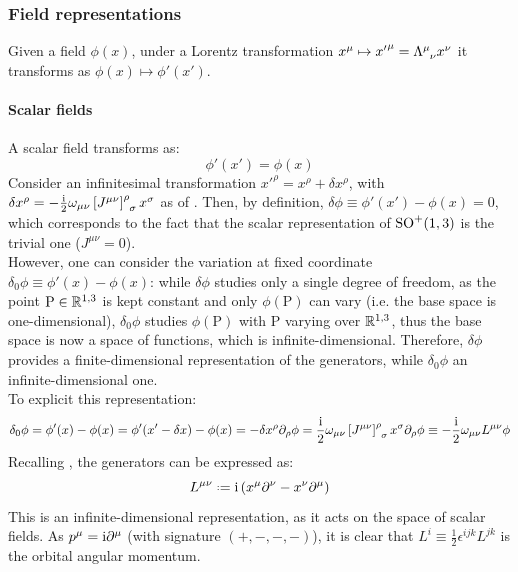 \subsubsection{Field representations}

Given a field $ \phi(x) $, under a Lorentz transformation $ x^\mu \mapsto {x'}^\mu = \tensor{\Lambda}{^\mu_\nu} x^\nu $ it transforms as $ \phi(x) \mapsto \phi'(x') $.

\paragraph{Scalar fields}

A scalar field transforms as:
\begin{equation}
  \phi'(x') = \phi(x)
\end{equation}
Consider an infinitesimal transformation $ x'^\rho = x^\rho + \delta x^\rho $, with $ \delta x^\rho = - \frac{\img}{2} \omega_{\mu \nu} \tensor{\left[ J^{\mu \nu} \right]}{^\rho_\sigma} x^\sigma $ as of . Then, by definition, $ \delta \phi \equiv \phi'(x') - \phi(x) = 0 $, which corresponds to the fact that the scalar representation of $ \mathrm{SO}^+(1,3) $ is the trivial one ($ J^{\mu \nu} = 0 $).\\
However, one can consider the variation at fixed coordinate $ \delta_0 \phi \equiv \phi'(x) - \phi(x) $: while $ \delta \phi $ studies only a single degree of freedom, as the point $ \text{P} \in \mathbb{R}^{1,3} $ is kept constant and only $ \phi(\text{P}) $ can vary (i.e. the base space is one-dimensional), $ \delta_0 \phi $ studies $ \phi(\text{P}) $ with $ \text{P} $ varying over $ \mathbb{R}^{1,3} $, thus the base space is now a space of functions, which is infinite-dimensional. Therefore, $ \delta \phi $ provides a finite-dimensional representation of the generators, while $ \delta_0 \phi $ an infinite-dimensional one.\\
To explicit this representation:
\begin{equation*}
  \delta_0 \phi = \phi'(x) - \phi(x) = \phi'(x' - \delta x) - \phi(x) = - \delta x^\rho \pa_\rho \phi = \frac{\img}{2} \omega_{\mu \nu} \tensor{\left[ J^{\mu \nu} \right]}{^\rho_\sigma} x^\sigma \pa_\rho \phi \equiv - \frac{\img}{2} \omega_{\mu \nu} L^{\mu \nu} \phi
\end{equation*}
Recalling , the generators can be expressed as:
\begin{equation}
  L^{\mu \nu} \defeq \img \left( x^\mu \pa^\nu - x^\nu \pa^\mu \right)
  \label{eq:ang-mom-oper}
\end{equation}
This is an infinite-dimensional representation, as it acts on the space of scalar fields. As $ p^\mu = \mathrm{i} \partial^\mu $ (with signature $ (+,-,-,-) $), it is clear that $ L^i \equiv \frac{1}{2} \epsilon^{ijk} L^{jk} $ is the orbital angular momentum.

